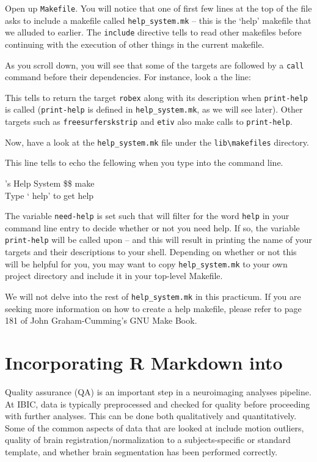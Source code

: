 Open up \texttt{Makefile}. You will notice that one of first few lines at the top of the file asks \maken{} to include a makefile called \texttt{help_system.mk} -- this is the `help' makefile that we alluded to earlier. The \texttt{include} directive tells \maken{} to read other makefiles before continuing with the execution of other things in the current makefile.  

As you scroll down, you will see that some of the targets are followed by a \texttt{call} command before their dependencies. For instance, look a the line:

This tells \maken{} to return the target \texttt{robex} along with its description when \texttt{print-help} is called (\texttt{print-help} is defined in \texttt{help_system.mk}, as we will see later). Other targets such as \texttt{freesurferskstrip} and \texttt{etiv} also make calls to \texttt{print-help}.

Now, have a look at the \texttt{help_system.mk} file under the \texttt{lib\textbackslash makefiles} directory.  

This line tells \maken{} to echo the fellowing when you type \maken{} into the command line.
\begin{bash}{\maken{}'s Help System}
\$\$ make \\
Type `\maken{} help' to get help
\end{bash}

The variable \texttt{need-help} is set such that \maken{} will filter for the word \texttt{help} in your command line entry to decide whether or not you need help. If so, the variable \texttt{print-help} will be called upon -- and this will result in \maken{} printing the name of your targets and their descriptions to your shell. Depending on whether or not this will be helpful for you, you may want to copy \texttt{help_system.mk} to your own project directory and include it in your top-level Makefile. 

We will not delve into the rest of \texttt{help_system.mk} in this practicum. If you are seeking more information on how to create a help makefile, please refer to page 181 of John Graham-Cumming's GNU Make Book. 

\section{Incorporating R Markdown into \maken{}}
Quality assurance (QA) is an important step in a neuroimaging analyses pipeline. At IBIC, data is typically  preprocessed and checked for quality before proceeding with further analyses. This can be done both qualitatively and quantitatively. Some of the common aspects of data that are looked at include motion outliers, quality of brain registration/normalization to a subjects-specific or standard template, and whether brain segmentation has been performed correctly. 

